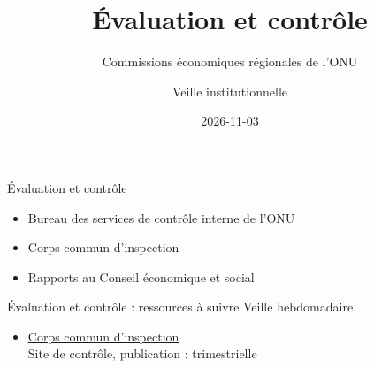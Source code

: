 \documentclass[aspectratio=169,11pt]{beamer}
\title{Évaluation et contrôle}
\subtitle{Commissions économiques régionales de l'ONU}
\author{Veille institutionnelle}
\date{2026-11-03}
\begin{document}
\begin{frame}\titlepage\end{frame}

\begin{frame}{Évaluation et contrôle}
\begin{itemize}
\item Bureau des services de contrôle interne de l'ONU
\item Corps commun d'inspection
\item Rapports au Conseil économique et social
\end{itemize}
\end{frame}

\begin{frame}{Évaluation et contrôle : ressources à suivre}
\small
Veille hebdomadaire.
\begin{itemize}
\item \href{https://www.unjiu.org}{Corps commun d'inspection}\\{\footnotesize Site de contrôle, publication : trimestrielle}
\end{itemize}
\end{frame}
\end{document}
